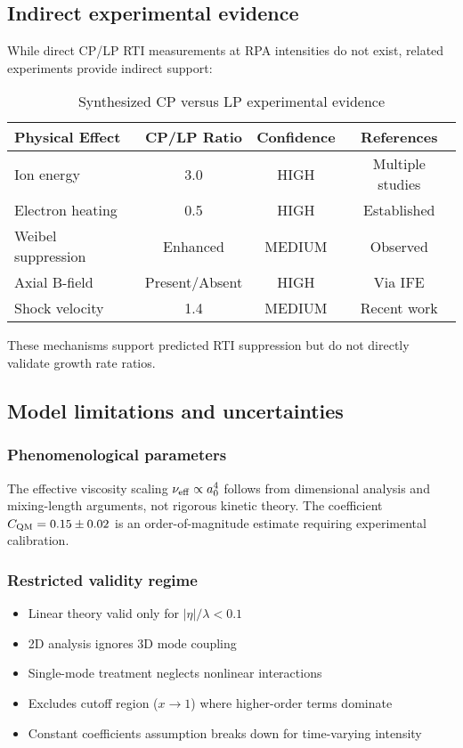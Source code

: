 \documentclass[aps,pre,twocolumn,showpacs,superscriptaddress]{revtex4-2}
\theoremstyle{definition}
\begin{document}
\subsection{Indirect experimental evidence}

While direct CP/LP RTI measurements at RPA intensities do not exist, related experiments provide indirect support:

\begin{table}[h]
\caption{Synthesized CP versus LP experimental evidence}
\label{tab:cpvslp}
\begin{ruledtabular}
\begin{tabular}{lccc}
Physical Effect & CP/LP Ratio & Confidence & References \\
\hline
Ion energy & 3.0 & HIGH & Multiple studies \\
Electron heating & 0.5 & HIGH & Established \\
Weibel suppression & Enhanced & MEDIUM & Observed \\
Axial B-field & Present/Absent & HIGH & Via IFE \\
Shock velocity & 1.4 & MEDIUM & Recent work \\
\end{tabular}
\end{ruledtabular}
\end{table}

These mechanisms support predicted RTI suppression but do not directly validate growth rate ratios.

\subsection{Model limitations and uncertainties}

\subsubsection{Phenomenological parameters}
The effective viscosity scaling $\nu_{\rm eff} \propto a_0^4$ follows from dimensional analysis and mixing-length arguments, not rigorous kinetic theory. The coefficient $C_{\rm QM} = 0.15 \pm 0.02$ is an order-of-magnitude estimate requiring experimental calibration.

\subsubsection{Restricted validity regime}
\begin{itemize}
\item Linear theory valid only for $|\eta|/\lambda < 0.1$
\item 2D analysis ignores 3D mode coupling
\item Single-mode treatment neglects nonlinear interactions
\item Excludes cutoff region ($x \to 1$) where higher-order terms dominate
\item Constant coefficients assumption breaks down for time-varying intensity
\end{itemize}
\end{document}
